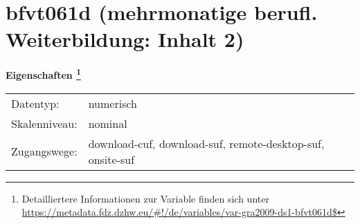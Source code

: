 
    \setcounter{footnote}{0}

    \vspace*{-1.8cm}
	\section{bfvt061d (mehrmonatige berufl. Weiterbildung: Inhalt 2)}
	\label{section:bfvt061d}



    \vspace*{0.5cm}
    \noindent\textbf{Eigenschaften
	\footnote{Detailliertere Informationen zur Variable finden sich unter
		\url{https://metadata.fdz.dzhw.eu/\#!/de/variables/var-gra2009-ds1-bfvt061d$}}}\\
	\begin{tabularx}{\hsize}{@{}lX}
	Datentyp: & numerisch \\
	Skalenniveau: & nominal \\
	Zugangswege: &
	  download-cuf, 
	  download-suf, 
	  remote-desktop-suf, 
	  onsite-suf
 \\
    \end{tabularx}



